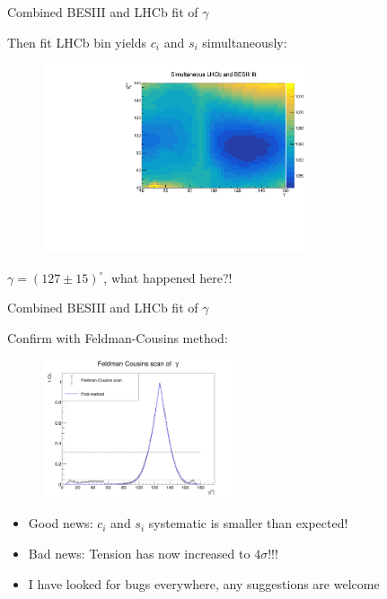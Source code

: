 \documentclass{beamer}
\begin{document}
\begin{frame}{Combined BESIII and LHCb fit of $\gamma$}
  \begin{center}
    {\large Then fit LHCb bin yields $c_i$ and $s_i$ simultaneously:}
  \end{center}
  \begin{figure}
    \includegraphics[width=0.7\textwidth]{Plots/Contours_gamma_deltaB_ModelIndependent_Scan.pdf}
  \end{figure}
  \begin{center}
    {\large $\gamma = (127 \pm 15)^\circ$, what happened here?!}
  \end{center}
\end{frame}

\begin{frame}{Combined BESIII and LHCb fit of $\gamma$}
  \begin{center}
    {\large Confirm with Feldman-Cousins method:}
  \end{center}
  \begin{figure}
    \includegraphics[width=0.5\textwidth]{Plots/FeldmanCousins_gamma.png}
  \end{figure}
  \begin{itemize}
    \setlength\itemsep{0.5em}
    \item{Good news: $c_i$ and $s_i$ systematic is smaller than expected!}
    \item{Bad news: Tension has now increased to $4\sigma$!!!}
    \item{I have looked for bugs everywhere, any suggestions are welcome}
  \end{itemize}
\end{frame}
\end{document}
